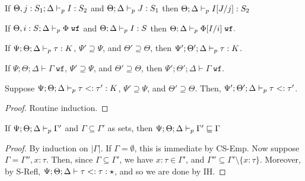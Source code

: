 \begin{theorem}
If $\Theta, j : S_1 ; \Delta \vdash_p I : S_2$ and $\Theta ; \Delta \vdash_p J : S_1$ then $\Theta ; \Delta \vdash_p I[J/j] : S_2$
\label{thm:idx-idx-subst}
\end{theorem}


\begin{theorem}
If $\Theta, i : S ; \Delta \vdash_p \Phi \; \texttt{wf}$ and $\Theta ; \Delta \vdash_p I : S$ then $\Theta ; \Delta \vdash_p \Phi[I/i] \; \texttt{wf}.$
\label{thm:constr-idx-subst}
\end{theorem}



\begin{theorem}
If $\Psi ; \Theta ; \Delta \vdash_p \tau : K$, $\Psi' \supseteq \Psi$, and $\Theta' \supseteq \Theta$, then
$\Psi' ; \Theta' ; \Delta \vdash_p \tau : K$.
\end{theorem}

\begin{theorem}
If $\Psi ; \Theta ; \Delta \vdash \Gamma \; \texttt{wf}$, $\Psi' \supseteq \Psi$, and $\Theta' \supseteq \Theta$, then
$\Psi' ; \Theta' ; \Delta \vdash \Gamma \; \texttt{wf}$.
\end{theorem}

\typeidxsubst*


\begin{theorem}
Suppose $\Psi ; \Theta ; \Delta \vdash_p \tau <: \tau' : K$, $\Psi' \supseteq \Psi$, and $\Theta' \supseteq \Theta$.
Then, $\Psi' ; \Theta' ; \Delta \vdash_p \tau <: \tau'$.
\end{theorem}

\subtystreng*
\begin{proof}
Routine induction.
\end{proof}


\begin{theorem}
If $\Psi ; \Theta ; \Delta \vdash_p \Gamma'$ and $\Gamma \subseteq \Gamma'$ as sets, then $\Psi ; \Theta ; \Delta \vdash_p \Gamma' \sqsubseteq \Gamma$
\label{thm:ctx-sub-subset1}
\end{theorem}
\begin{proof}
By induction on $|\Gamma|$.
If $\Gamma = \emptyset$, this is immediate by CS-Emp.
Now suppose $\Gamma = \Gamma'', x : \tau$. Then, since $\Gamma \subseteq \Gamma'$, we have $x : \tau \in \Gamma'$, and $\Gamma'' \subseteq \Gamma' \setminus \{x : \tau\}$. Moreover, by S-Refl, $\Psi ; \Theta ; \Delta \vdash \tau <: \tau : \star$, and so we are done by IH.
\end{proof}

